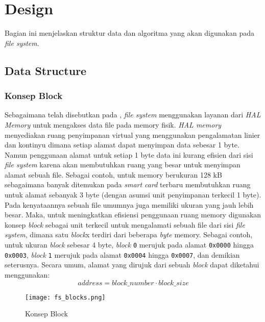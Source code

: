 \documentclass[a4paper, 12pt]{report}
\begin{document}
\chapter{Design}
\label{design}

Bagian ini menjelaskan struktur data dan algoritma yang akan digunakan pada \emph{file system}.

\section{Data Structure}
\label{data-structure}

\subsection{Konsep Block}
\label{block-concept}

Sebagaimana telah disebutkan pada , \emph{file system} menggunakan layanan dari \emph{HAL Memory} untuk mengakses data file pada memory fisik. \emph{HAL memory} menyediakan ruang penyimpanan virtual yang menggunakan  pengalamatan linier dan kontinyu dimana setiap alamat dapat menyimpan data sebesar 1 byte. Namun penggunaan alamat untuk setiap 1 byte data ini kurang efisien dari sisi \emph{file system} karena akan membutuhkan ruang yang besar untuk menyimpan alamat sebuah file. Sebagai contoh, untuk memory berukuran 128 kB sebagaimana banyak ditemukan pada \textsl{smart card} terbaru membutuhkan ruang untuk alamat sebanyak 3 byte (dengan asumsi unit penyimpanan terkecil 1 byte). Pada kenyataannya sebuah file umumnya juga memiliki ukuran yang jauh lebih besar. Maka, untuk meningkatkan efisiensi penggunaan ruang memory digunakan konsep \emph{block} sebagai unit terkecil untuk mengalamati sebuah file dari sisi \emph{file system}, dimana satu \emph{block}x terdiri dari beberapa \emph{byte} memory. Sebagai contoh, untuk ukuran \emph{block} sebesar 4 byte, \emph{block} \texttt{0} merujuk pada alamat \texttt{0x0000} hingga \texttt{0x0003}, \emph{block} \texttt{1} merujuk pada alamat \texttt{0x0004} hingga \texttt{0x0007}, dan demikian seterusnya. Secara umum, alamat yang dirujuk dari sebuah \emph{block} dapat diketahui menggunakan:
$$
address=block\_number \cdot block\_size
$$


\begin{figure}[h]
\centering
\texttt{[image: fs\_blocks.png]}
\caption{Konsep Block}
\label{fig-block-concept}
\end{figure}
\end{document}
